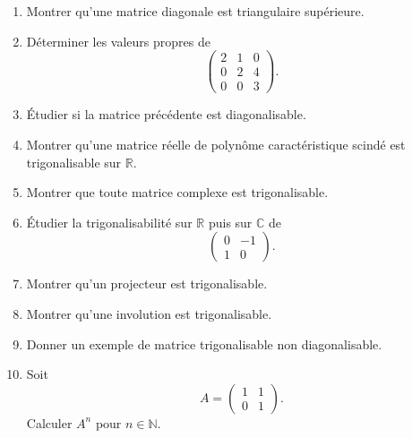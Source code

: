 \documentclass[11pt,a4paper]{article}
\theoremstyle{remark}
\newcommand{\R}{\mathbb{R}}
\newcommand{\C}{\mathbb{C}}
\newcommand{\N}{\mathbb{N}}
\begin{document}
\begin{enumerate}[label=\textbf{Exercice \arabic*.}]
    \item Montrer qu’une matrice diagonale est triangulaire supérieure.

    \item Déterminer les valeurs propres de
    \[
    \begin{pmatrix}
    2 & 1 & 0\\
    0 & 2 & 4\\
    0 & 0 & 3
    \end{pmatrix}.
    \]

    \item Étudier si la matrice précédente est diagonalisable.

    \item Montrer qu’une matrice réelle de polynôme caractéristique scindé est trigonalisable sur \(\R\).

    \item Montrer que toute matrice complexe est trigonalisable.

    \item Étudier la trigonalisabilité sur \(\R\) puis sur \(\C\) de
    \[
    \begin{pmatrix}
    0 & -1\\
    1 & 0
    \end{pmatrix}.
    \]

    \item Montrer qu’un projecteur est trigonalisable.

    \item Montrer qu’une involution est trigonalisable.

    \item Donner un exemple de matrice trigonalisable non diagonalisable.

    \item Soit
    \[
    A=
    \begin{pmatrix}
    1 & 1\\
    0 & 1
    \end{pmatrix}.
    \]
    Calculer \(A^n\) pour \(n\in\N\).
\end{enumerate}
\end{document}
